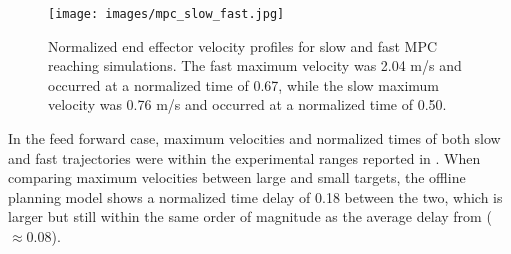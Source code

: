 \documentclass[letterpaper, 10pt, conference]{ieeeconf}
\newcommand{\todo}[1]{\textcolor{red}{\textbf{TODO:} #1}}
\begin{document}
\begin{figure}[h]
    \centering
    \texttt{[image: images/mpc\_slow\_fast.jpg]}
    \caption{Normalized end effector velocity profiles for slow and fast MPC reaching simulations. The fast maximum velocity was 2.04 m/s and occurred at a normalized time of 0.67, while the slow maximum velocity was 0.76 m/s and occurred at a normalized time of 0.50.}
    \label{fig:VelocityMPC}
\end{figure}

In the feed forward case, maximum velocities and normalized times of both slow and fast trajectories were within the experimental ranges reported in \cite{soechting_target_size}.
When comparing maximum velocities between large and small targets, the offline planning model shows a normalized time delay of 0.18 between the two, which is larger but still within the same order of magnitude as the average delay from \cite{soechting_target_size} ($\approx 0.08$). 
\end{document}
